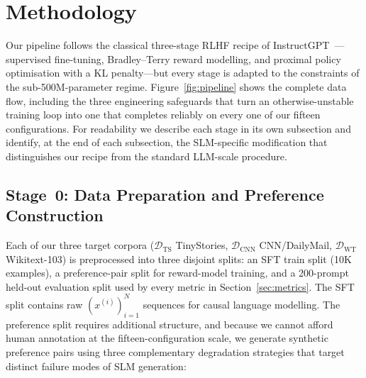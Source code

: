\documentclass[10pt,twocolumn,letterpaper]{article}
\begin{document}
\section{Methodology}
\label{sec:method}

Our pipeline follows the classical three-stage RLHF recipe of InstructGPT~\cite{ouyang2022training}---supervised fine-tuning, Bradley--Terry reward modelling, and proximal policy optimisation with a KL penalty---but every stage is adapted to the constraints of the sub-500M-parameter regime. Figure~\ref{fig:pipeline} shows the complete data flow, including the three engineering safeguards that turn an otherwise-unstable training loop into one that completes reliably on every one of our fifteen configurations. For readability we describe each stage in its own subsection and identify, at the end of each subsection, the SLM-specific modification that distinguishes our recipe from the standard LLM-scale procedure.

\subsection{Stage~0: Data Preparation and Preference Construction}
\label{sec:data}

Each of our three target corpora ($\mathcal{D}_{\text{TS}}$ TinyStories, $\mathcal{D}_{\text{CNN}}$ CNN/DailyMail, $\mathcal{D}_{\text{WT}}$ Wikitext-103) is preprocessed into three disjoint splits: an SFT train split (10K examples), a preference-pair split for reward-model training, and a 200-prompt held-out evaluation split used by every metric in Section~\ref{sec:metrics}. The SFT split contains raw $(x^{(i)})_{i=1}^{N}$ sequences for causal language modelling. The preference split requires additional structure, and because we cannot afford human annotation at the fifteen-configuration scale, we generate synthetic preference pairs using three complementary degradation strategies that target distinct failure modes of SLM generation:
\end{document}
